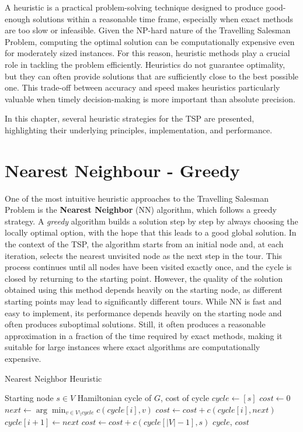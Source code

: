 A heuristic is a practical problem-solving technique designed to produce good-enough solutions within a reasonable time frame, 
especially when exact methods are too slow or infeasible. Given the NP-hard nature of the Travelling Salesman Problem, 
computing the optimal solution can be computationally expensive even for moderately sized instances. For this reason, heuristic methods 
play a crucial role in tackling the problem efficiently. Heuristics do not guarantee optimality, but they can often provide solutions 
that are sufficiently close to the best possible one. This trade-off between accuracy and speed makes heuristics particularly valuable 
when timely decision-making is more important than absolute precision.

In this chapter, several heuristic strategies for the TSP are presented, highlighting their underlying principles, implementation, and performance.

\section{Nearest Neighbour - Greedy}

One of the most intuitive heuristic approaches to the Travelling Salesman Problem is the \textbf{Nearest Neighbor} (NN) algorithm, which follows a greedy strategy. 
A \textit{greedy} algorithm builds a solution step by step by always choosing the locally optimal option, with the hope that this leads to a good global solution.
In the context of the TSP, the algorithm starts from an initial node and, at each iteration, selects the nearest unvisited node as the next step in the tour. 
This process continues until all nodes have been visited exactly once, and the cycle is closed by returning to the starting point.
However, the quality of the solution obtained using this method depends heavily on the starting node, as different starting points may lead to significantly 
different tours.
While NN is fast and easy to implement, its performance depends heavily on the starting node and often produces suboptimal solutions. Still, it often produces a reasonable approximation in a fraction of the time required by exact methods, making it suitable for large instances where exact algorithms are computationally expensive.

\begin{algorithm}
\caption{Nearest Neighbor Heuristic}
\begin{algorithmic}
  \Require Starting node $s \in V$
  \Ensure Hamiltonian cycle of $G$, cost of cycle
  \State $cycle \gets [s]$
  \State $cost \gets 0$
    \State $next \gets \arg\min_{v \in V \setminus cycle} c(cycle[i], v)$
    \State $cost \gets cost + c(cycle[i], next)$
    \State $cycle[i+1] \gets next$
  \EndFor
  \State $cost \gets cost + c(cycle[|V| - 1], s)$
  \State \Return $cycle$, $cost$
\end{algorithmic}
\end{algorithm}

